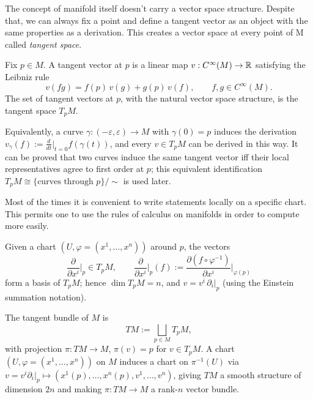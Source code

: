 The concept of manifold itself doesn't carry a vector space structure. Despite that, we can always fix a point and define a tangent vector as an object with the same properties as a derivation. This creates a vector space at every point of M called \textit{tangent space}.

\begin{definition}\label{def:tan-space}
	Fix $p \in M$. A tangent vector at $p$ is a linear map $v : C^\infty(M) \to \mathbb{R}$ satisfying the Leibniz rule
	\[
	v(fg) = f(p)\,v(g) + g(p)\,v(f), \qquad f,g \in C^\infty(M).
	\]
	The set of tangent vectors at $p$, with the natural vector space structure, is the tangent space $T_pM$.
\end{definition}

\begin{remark}
	Equivalently, a curve $\gamma:(-\varepsilon,\varepsilon)\to M$ with $\gamma(0)=p$ induces the derivation $v_\gamma(f) := \frac{d}{dt}\Big|_{t=0} f(\gamma(t))$, and every $v \in T_pM$ can be derived in this way. It can be proved that two curves induce the same tangent vector iff their local representatives agree to first order at $p$; this equivalent identification $T_pM \cong \{\text{curves through } p\}/\!\sim$ is used later.
\end{remark}

Most of the times it is convenient to write statements locally on a specific chart. This permits one to use the rules of calculus on manifolds in order to compute more easily.

\begin{definition}\label{def:coord}
	Given a chart $(U,\varphi=(x^1,\dots,x^n))$ around $p$, the vectors
	\[
	\frac{\partial}{\partial x^i}\bigg|_p \in T_pM, \qquad
	\frac{\partial}{\partial x^i}\bigg|_p(f) := \frac{\partial (f\circ\varphi^{-1})}{\partial x^i}\bigg|_{\varphi(p)}
	\]
	form a basis of $T_pM$; hence $\dim T_pM = n$, and $v = v^i\, \partial_i |_p$ (using the Einstein summation notation).
\end{definition}

\begin{definition}\label{def:tan-bundle}
	The tangent bundle of $M$ is
	\[
	TM := \bigsqcup_{p \in M} T_pM,
	\]
	with projection $\pi: TM \to M$, $\pi(v) = p$ for $v \in T_pM$. A chart $(U,\varphi=(x^1,\dots,x^n))$ on $M$ induces a chart on $\pi^{-1}(U)$ via $v = v^i \partial_i|_p \mapsto (x^1(p),\dots,x^n(p),v^1,\dots,v^n)$, giving $TM$ a smooth structure of dimension $2n$ and making $\pi: TM \to M$ a rank-$n$ vector bundle.
\end{definition}


